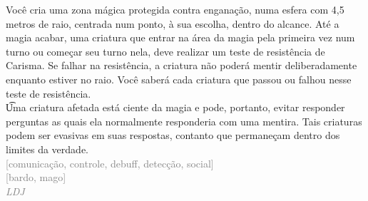 \documentclass{RPG_Adventure}[2021/10/20]
\begin{document}
{\normalsize Você cria uma zona mágica protegida contra enganação, numa esfera com 4,5 metros de raio, centrada num ponto, à sua escolha, dentro do alcance. Até a magia acabar, uma criatura que entrar na área da magia pela primeira vez num turno ou começar seu turno nela, deve realizar um teste de resistência de Carisma. Se falhar na resistência, a criatura não poderá mentir deliberadamente enquanto estiver no raio. Você saberá cada criatura que passou ou falhou nesse teste de resistência.\\\t Uma criatura afetada está ciente da magia e pode, portanto, evitar responder perguntas as quais ela normalmente responderia com uma mentira. Tais criaturas podem ser evasivas em suas respostas, contanto que permaneçam dentro dos limites da verdade.\\}
{\scriptsize \textcolor{gray}{[comunicação, controle, debuff, detecção, social]\\}}
{\scriptsize \textcolor{gray}{[bardo, mago]\\}}
{\tiny \textcolor{gray}{\textit{LDJ}}}\jump

\end{document}
